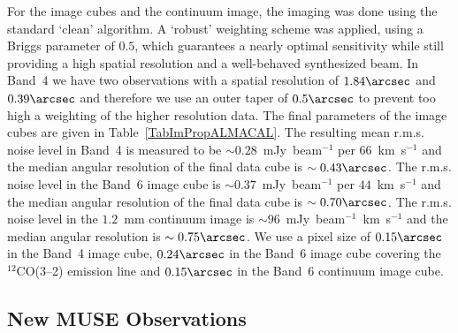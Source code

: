 \documentclass[a4paper,fleqn,usenatbib]{mnras}
\begin{document}
For the image cubes and the continuum image, the imaging was done using the standard `clean' algorithm. A `robust' weighting scheme was applied, using a Briggs parameter of $0.5$, which guarantees a nearly optimal sensitivity while still providing a high spatial resolution and a well-behaved synthesized beam. In Band~4 we have two observations with a spatial resolution of $1.84\arcsec$ and $0.39\arcsec$ and therefore we use an outer taper of $0.5\arcsec$ to prevent too high a weighting of the higher resolution data. The final parameters of the image cubes are given in Table~\ref{TabImPropALMACAL}. The resulting mean r.m.s. noise level in Band~4 is measured to be $\sim0.28$~mJy~beam$^{-1}$ per $66$~km~s$^{-1}$ and the median angular resolution of the final data cube is $\sim0.43\arcsec$. The r.m.s. noise level in the Band~6 image cube is $\sim0.37$~mJy~beam$^{-1}$ per $44$~km~s$^{-1}$ and the median angular resolution of the final data cube is $\sim0.70\arcsec$. The r.m.s. noise level in the $1.2$~mm continuum image is $\sim96$~mJy~beam$^{-1}$~km~s$^{-1}$ and the median angular resolution is $\sim 0.75 \arcsec$. We use a pixel size of $0.15\arcsec$ in the Band~4 image cube, $0.24\arcsec$ in the Band~6 image cube covering the $^{12}$CO(3--2) emission line and $0.15\arcsec$ in the Band~6 continuum image cube.

\subsection{New MUSE Observations}

\end{document}
